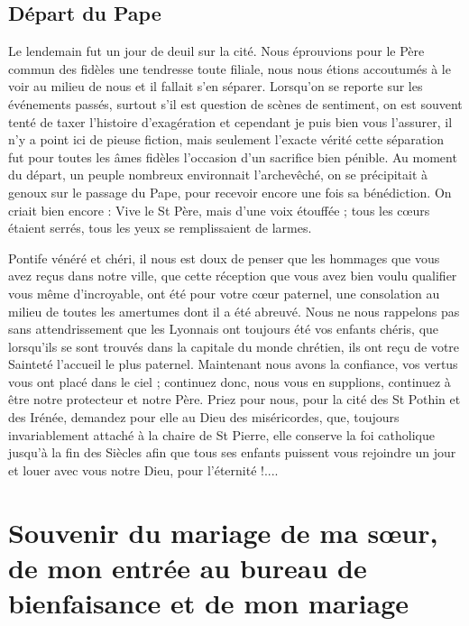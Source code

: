 \documentclass[11pt,a4paper]{report}
\begin{document}
\section*{Départ du Pape}

Le lendemain fut un jour de deuil sur la cité. Nous éprouvions pour le Père commun des fidèles une tendresse toute filiale, nous nous étions accoutumés à le voir au milieu de nous et il fallait s'en séparer. Lorsqu'on se reporte sur les événements passés, surtout s'il est question de scènes de sentiment, on est souvent tenté de taxer l'histoire d'exagération et cependant je puis bien vous l'assurer, il n'y a point ici de pieuse fiction, mais seulement l'exacte vérité cette séparation fut pour toutes les âmes fidèles l'occasion d'un sacrifice bien pénible. Au moment du départ, un peuple nombreux environnait l'archevêché, on se précipitait à genoux sur le passage du Pape, pour recevoir encore une fois sa bénédiction. On criait bien encore : Vive le St Père, mais d'une voix étouffée ; tous les cœurs étaient serrés, tous les yeux se remplissaient de larmes.

Pontife vénéré et chéri, il nous est doux de penser que les hommages que vous avez reçus dans notre ville, que cette réception que vous avez bien voulu qualifier vous même d'incroyable, ont été pour votre cœur paternel, une consolation au milieu de toutes les amertumes dont il a été abreuvé. Nous ne nous rappelons pas sans attendrissement que les Lyonnais ont toujours été vos enfants chéris, que lorsqu'ils se sont trouvés dans la capitale du monde chrétien, ils ont reçu de votre Sainteté l'accueil le plus paternel. Maintenant nous avons la confiance, vos vertus vous ont placé dans le ciel ; continuez donc, nous vous en supplions, continuez à être notre protecteur et notre Père. Priez pour nous, pour la cité des St Pothin et des Irénée, demandez pour elle au Dieu des miséricordes, que, toujours invariablement attaché à la chaire de St Pierre, elle conserve la foi catholique jusqu'à la fin des Siècles afin que tous ses enfants puissent vous rejoindre un jour et louer avec vous notre Dieu, pour l'éternité !....

\chapter{Souvenir du mariage de ma sœur, de mon entrée au bureau de bienfaisance et de mon mariage}
\end{document}
